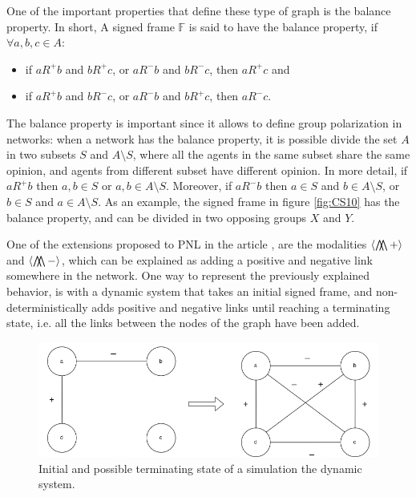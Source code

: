 One of the important properties that define these type of graph is the balance property. In short, A signed frame $\mathbb{F}$ is said to have the balance property, if $\forall a,b,c \in A$:
\begin{itemize}
    \item if $aR^+b$ and $bR^+c$, or $aR^-b$ and $bR^-c$, then $aR^+c$ and
    \item if $aR^+b$ and $bR^-  c$, or $aR^-b$ and $bR^+c$, then $aR^-c$.
\end{itemize}
The balance property is important since it allows to define group polarization in networks: when a network has the balance property, it is possible divide the set $A$ in two subsets $S$ and $A \setminus S$, where all the agents in the same subset share the same opinion, and agents from different subset have different opinion. In more detail, if $aR^+b$ then $a,b \in S$ or $a,b \in A \setminus S$. Moreover, if $aR^-b$ then $a \in S$ and $b \in A \setminus S$, or $b \in S$ and $a \in A \setminus S$. As an example, the signed frame in figure \ref{fig:CS10} has the balance property, and can be divided in two opposing groups $X$ and $Y$.

One of the extensions proposed to PNL in the article \cite{PNL1}, are the modalities $\langle \operatorname*{\bigwedge\mkern-12mu\bigwedge} +\rangle$ and $\langle \operatorname*{\bigwedge\mkern-12mu\bigwedge} - \rangle$, which can be explained as adding a positive and negative link somewhere in the network. One way to represent the previously explained behavior, is with a dynamic system that takes an initial signed frame, and non-deterministically adds positive and negative links until reaching a terminating state, i.e. all the links between the nodes of the graph have been added.

\begin{figure}[H]
    \centering
    \includegraphics[scale=0.5]{images/CS11.png}
    \caption{Initial and possible terminating state of a simulation the dynamic system.}
    \label{fig:CS11}
\end{figure}

